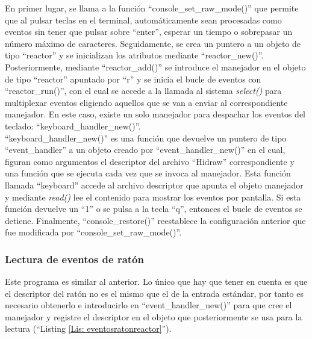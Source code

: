 En primer lugar, se llama a la función ``console\_set\_raw\_mode()'' que permite que al pulsar teclas en el terminal, automáticamente sean procesadas como eventos sin tener que pulsar sobre ``enter'', esperar un tiempo o sobrepasar un número máximo de caracteres. Seguidamente, se crea un puntero a un objeto de tipo ``reactor'' y se inicializan los atributos mediante ``reactor\_new()''. Posteriormente, mediante ``reactor\_add()'' se introduce el manejador en el objeto de tipo ``reactor'' apuntado por ``r'' y se inicia el bucle de eventos con ``reactor\_run()'', con el cual se accede a la llamada al sistema {\itshape select()} para multiplexar eventos eligiendo aquellos que se van a enviar al correspondiente manejador. En este caso, existe un solo manejador para despachar los eventos del teclado: ``keyboard\_handler\_new()''. \\
``keyboard\_handler\_new()'' es una función que devuelve un puntero de tipo ``event\_handler'' a un objeto creado por ``event\_handler\_new()'' en el cual, figuran como argumentos el descriptor del archivo ``Hidraw'' correspondiente y una función que se ejecuta cada vez que se invoca al manejador. Esta función llamada ``keyboard'' accede al archivo descriptor que apunta el objeto manejador y mediante {\itshape read()} lee el contenido para mostrar los eventos por pantalla. Si esta función devuelve un ``1'' o se pulsa a la tecla ``q'', entonces el bucle de eventos se detiene. Finalmente, ``console\_restore()'' reestablece la configuración anterior que fue modificada por ``console\_set\_raw\_mode()''. 



\subsubsection{Lectura de eventos de ratón}\label{s3_1_2_2}

Este programa es similar al anterior. Lo único que hay que tener en cuenta es que el descriptor del ratón no es el mismo que el de la entrada estándar, por tanto es necesario obtenerlo e introducirlo en ``event\_handler\_new()'' para que cree el manejador y registre el descriptor en el objeto que posteriormente se usa para la lectura (``Listing \ref{Lis: eventosratonreactor}''). 

